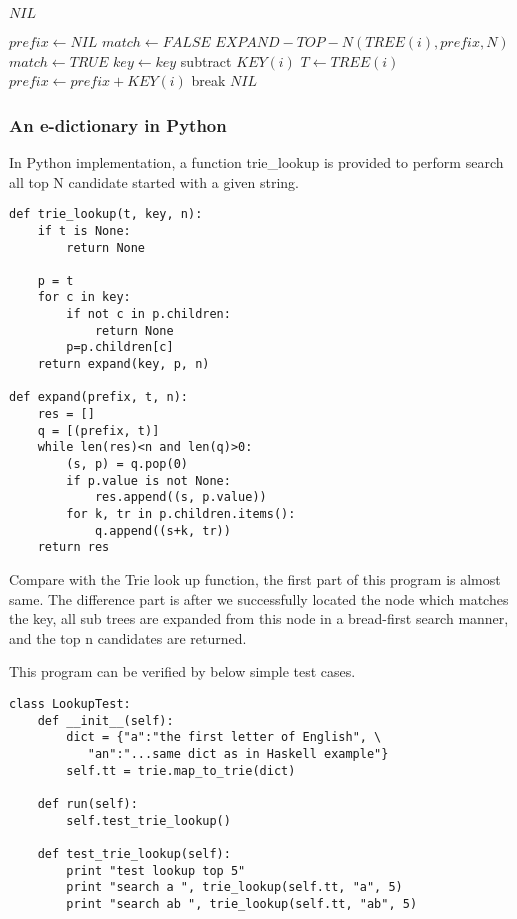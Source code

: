 \documentclass{article}
\begin{document}
\begin{algorithmic}[1]
     \State \Return $NIL$ \EndIf

  \State $prefix \leftarrow NIL$
  \Repeat
    \State $match \leftarrow FALSE$
        \State \Return $EXPAND-TOP-N(TREE(i), prefix, N)$
      \EndIf
        \State $match \leftarrow TRUE$
        \State $key \leftarrow key$ subtract $KEY(i)$
        \State $T \leftarrow TREE(i)$
        \State $prefix \leftarrow prefix + KEY(i)$
        \State break
      \EndIf
    \EndFor
  \State \Return $NIL$
\EndFunction
\end{algorithmic}

\subsubsection*{An e-dictionary in Python}
In Python implementation, a function trie\_lookup is provided to perform
search all top N candidate started with a given string.

\lstset{language=Python}
\begin{lstlisting}
def trie_lookup(t, key, n):
    if t is None:
        return None

    p = t
    for c in key:
        if not c in p.children:
            return None
        p=p.children[c]
    return expand(key, p, n)

def expand(prefix, t, n):
    res = []
    q = [(prefix, t)]
    while len(res)<n and len(q)>0:
        (s, p) = q.pop(0)
        if p.value is not None:
            res.append((s, p.value))
        for k, tr in p.children.items():
            q.append((s+k, tr))
    return res
\end{lstlisting}

Compare with the Trie look up function, the first part of this program is almost
same. The difference part is after we successfully located the node
which matches the key, all sub trees are expanded from this node in a
bread-first search manner, and the top n candidates are returned.

This program can be verified by below simple test cases.

\begin{lstlisting}
class LookupTest:
    def __init__(self):
        dict = {"a":"the first letter of English", \
           "an":"...same dict as in Haskell example"}
        self.tt = trie.map_to_trie(dict)

    def run(self):
        self.test_trie_lookup()

    def test_trie_lookup(self):
        print "test lookup top 5"
        print "search a ", trie_lookup(self.tt, "a", 5)
        print "search ab ", trie_lookup(self.tt, "ab", 5)
\end{lstlisting}
\end{document}
